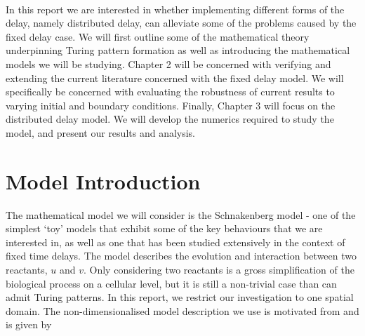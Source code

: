 \documentclass[12pt,a4paper]{report}
\begin{document}
\\
In this report we are interested in whether implementing different forms of the delay, namely distributed delay, can alleviate some of the problems caused by the fixed delay case. We will first outline some of the mathematical theory underpinning Turing pattern formation as well as introducing the mathematical models we will be studying. Chapter 2 will be concerned with verifying and extending the current literature concerned with the fixed delay model. We will specifically be concerned with evaluating the robustness of current results to varying initial and boundary conditions. Finally, Chapter 3 will focus on the distributed delay model. We will develop the numerics required to study the model, and present our results and analysis.

\section{Model Introduction}
The mathematical model we will consider is the Schnakenberg model \cite{schnakenberg} - one of the simplest `toy' models that exhibit some of the key behaviours that we are interested in, as well as one that has been studied extensively in the context of fixed time delays. The model describes the evolution and interaction between two reactants, $u$ and $v$. Only considering two reactants is a gross simplification of the biological process on a cellular level, but it is still a non-trivial case than can admit Turing patterns. In this report, we restrict our investigation to one spatial domain. The non-dimensionalised model description we use is motivated from \cite{gaffmonk} and is given by
\end{document}
